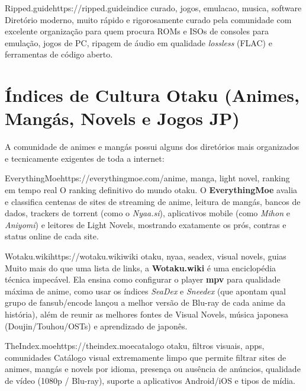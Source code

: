 \documentclass{pousadaguide}
\begin{document}
\begin{ferramenta}[recomendado,logo=ripped-guide]{Ripped.guide}{https://ripped.guide}{indice curado, jogos, emulacao, musica, software}
Diretório moderno, muito rápido e rigorosamente curado pela comunidade com excelente organização para quem procura ROMs e ISOs de consoles para emulação, jogos de PC, ripagem de áudio em qualidade \emph{lossless} (FLAC) e ferramentas de código aberto. 
\end{ferramenta}

\section{Índices de Cultura Otaku (Animes, Mangás, Novels e Jogos JP)}

A comunidade de animes e mangás possui alguns dos diretórios mais organizados e tecnicamente exigentes de toda a internet:

\begin{ferramenta}[goat,logo=everythingmoe]{EverythingMoe}{https://everythingmoe.com/}{anime, manga, light novel, ranking em tempo real}
O ranking definitivo do mundo otaku. O \textbf{EverythingMoe} avalia e classifica centenas de sites de streaming de anime, leitura de mangás, bancos de dados, trackers de torrent (como o \emph{Nyaa.si}), aplicativos mobile (como \emph{Mihon} e \emph{Aniyomi}) e leitores de Light Novels, mostrando exatamente os prós, contras e status online de cada site. 
\end{ferramenta}

\begin{ferramenta}[goat,logo=wotaku]{Wotaku.wiki}{https://wotaku.wiki}{wiki otaku, nyaa, seadex, visual novels, guias}
Muito mais do que uma lista de links, a \textbf{Wotaku.wiki} é uma enciclopédia técnica impecável. Ela ensina como configurar o player \textbf{mpv} para qualidade máxima de anime, como usar os índices \emph{SeaDex} e \emph{Sneedex} (que apontam qual grupo de fansub/encode lançou a melhor versão de Blu-ray de cada anime da história), além de reunir as melhores fontes de Visual Novels, música japonesa (Doujin/Touhou/OSTs) e aprendizado de japonês. 
\end{ferramenta}

\begin{ferramenta}[recomendado,logo=theindex]{TheIndex.moe}{https://theindex.moe}{catalogo otaku, filtros visuais, apps, comunidades}
Catálogo visual extremamente limpo que permite filtrar sites de animes, mangás e novels por idioma, presença ou ausência de anúncios, qualidade de vídeo (1080p / Blu-ray), suporte a aplicativos Android/iOS e tipos de mídia. 
\end{ferramenta}
\end{document}
